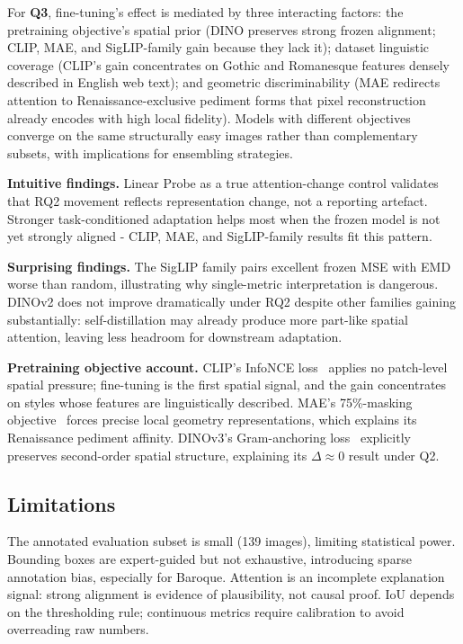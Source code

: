 \documentclass[lineno,pdflatex,sn-mathphys-num]{sn-jnl}%
\theoremstyle{thmstyleone}%
\theoremstyle{thmstyletwo}%
\theoremstyle{thmstylethree}%
\begin{document}
For \textbf{Q3}, fine-tuning's effect is mediated by three interacting factors: the pretraining objective's spatial prior (DINO preserves strong frozen alignment; CLIP, MAE, and SigLIP-family gain because they lack it); dataset linguistic coverage (CLIP's gain concentrates on Gothic and Romanesque features densely described in English web text); and geometric discriminability (MAE redirects attention to Renaissance-exclusive pediment forms that pixel reconstruction already encodes with high local fidelity). Models with different objectives converge on the same structurally easy images rather than complementary subsets, with implications for ensembling strategies.

\textbf{Intuitive findings.} Linear Probe as a true attention-change control validates that RQ2 movement reflects representation change, not a reporting artefact. Stronger task-conditioned adaptation helps most when the frozen model is not yet strongly aligned - CLIP, MAE, and SigLIP-family results fit this pattern.

\textbf{Surprising findings.} The SigLIP family pairs excellent frozen MSE with EMD worse than random, illustrating why single-metric interpretation is dangerous. DINOv2 does not improve dramatically under RQ2 despite other families gaining substantially: self-distillation may already produce more part-like spatial attention, leaving less headroom for downstream adaptation.

\textbf{Pretraining objective account.} CLIP's InfoNCE loss~\cite{Radford21CLIP} applies no patch-level spatial pressure; fine-tuning is the first spatial signal, and the gain concentrates on styles whose features are linguistically described. MAE's 75\%-masking objective~\cite{He22MAE} forces precise local geometry representations, which explains its Renaissance pediment affinity. DINOv3's Gram-anchoring loss~\cite{Simeoni26DINOv3} explicitly preserves second-order spatial structure, explaining its $\Delta\!\approx\!0$ result under Q2.


\subsection{Limitations}

The annotated evaluation subset is small (139 images), limiting statistical power. Bounding boxes are expert-guided but not exhaustive, introducing sparse annotation bias, especially for Baroque. Attention is an incomplete explanation signal: strong alignment is evidence of plausibility, not causal proof. IoU depends on the thresholding rule; continuous metrics require calibration to avoid overreading raw numbers.
\end{document}
